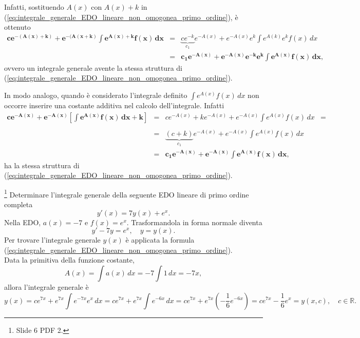 Infatti, sostituendo $A(x)$ con $A(x)+k$ in (\ref{eq:integrale_generale_EDO_lineare_non_omogonea_primo_ordine}), è ottenuto
\begin{equation*}
    \begin{matrix}
        \boldsymbol{ce^{-(A(x)+k)}+e^{-(A(x+k)}\int e^{A(x)+k}f(x)\, dx} &=& \underbrace{ce^{-k}}_{c_1}e^{-A(x)}+e^{-A(x)}e^{k}\int e^{A(k)} e^k f(x)\, dx\\
        &\boldsymbol=& \boldsymbol{c_1 e^{-A(x)}+e^{-A(x)} e^{-k}e^k\int e^{A(x)}f(x)\, dx,}
    \end{matrix}
\end{equation*}
ovvero un integrale generale avente la stessa struttura di (\ref{eq:integrale_generale_EDO_lineare_non_omogonea_primo_ordine}).

In modo analogo, quando è considerato l'integrale definito $\int e^{A(x)} f(x)\, dx$ non occorre inserire una costante additiva nel calcolo dell'integrale. Infatti
\begin{equation*}
    \begin{matrix}
        \boldsymbol{c e^{-A(x)}+e^{-A(x)}\left[\int e^{A(x)}f(x)\, dx+k\right]} &=& ce^{-A(x)}+ke^{-A(x)}+e^{-A(x)}\int e^{A(x)}f(x)\, dx &=&\\\\
        &=&\underbrace{(c+k)}_{c_1}e^{-A(x)} + e^{-A(x)}\int e^{A(x)}f(x)\, dx \\
        &\boldsymbol=& \boldsymbol{c_1 e^{-A(x)} + e^{-A(x)}\int e^{A(x)}f(x)\, dx},
    \end{matrix}
\end{equation*}
ha la stessa struttura di (\ref{eq:integrale_generale_EDO_lineare_non_omogonea_primo_ordine}).

\begin{example}\footnote{Slide 6 PDF 2.}
    Determinare l'integrale generale della seguente EDO lineare di primo ordine completa
    \begin{equation*}
        y'(x)=7y(x)+e^x.
    \end{equation*}
    Nella EDO, $a(x) = -7$ e $f(x) = e^x$. Trasformandola in forma normale diventa
    \begin{equation*}
        y'-7y=e^x,\quad y=y(x).
    \end{equation*}
    Per trovare l'integrale generale $y(x)$ è applicata la formula (\ref{eq:integrale_generale_EDO_lineare_non_omogonea_primo_ordine}).\\
    Data la primitiva della funzione costante,
    \begin{equation*}
        A(x)=\int a(x)\, dx=-7\int 1\, dx=-7x,
    \end{equation*}
    allora l'integrale generale è
    \begin{equation*}
        y(x)=ce^{7x}+e^{7x}\int e^{-7x}e^x\, dx=ce^{7x}+e^{7x}\int e^{-6x}\, dx=c e^{7x}+e^{7x}\left(-\frac{1}{6}e^{-6x}\right)=ce^{7x}-\frac{1}{6}e^x=y(x,c),\quad c\in\mathbb R.
    \end{equation*}
\end{example}

